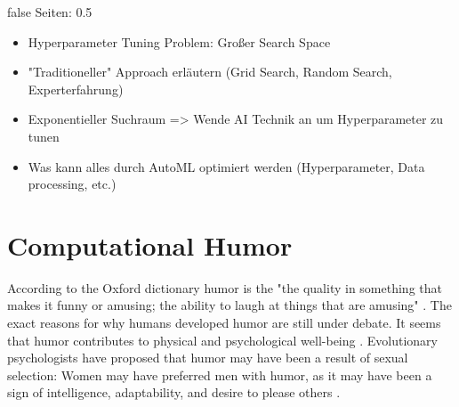 \documentclass[draft,final,oneside]{vutinfth} %
\begin{document}
\if false
Seiten: 0.5

\begin{itemize}
\item Hyperparameter Tuning Problem: Großer Search Space
\item "Traditioneller" Approach erläutern (Grid Search, Random Search, Experterfahrung)
\item Exponentieller Suchraum => Wende AI Technik an um Hyperparameter zu tunen
\item Was kann alles durch AutoML optimiert werden (Hyperparameter, Data processing, etc.)
\end{itemize}

\fi

\section{Computational Humor} \label{comphumorbackground}

According to the Oxford dictionary humor is the "the quality in something that makes it funny or amusing; the ability to laugh at things that are amusing" \cite{humordef}. The exact reasons for why humans developed humor are still under debate. It seems that humor contributes to physical and psychological well-being \cite{humorhealthy}\cite{humorresearch}. Evolutionary psychologists have proposed that humor may have been a result of sexual selection: Women may have preferred men with humor, as it may have been a sign of intelligence, adaptability, and desire to please others \cite{sep-humor}.	
\end{document}
